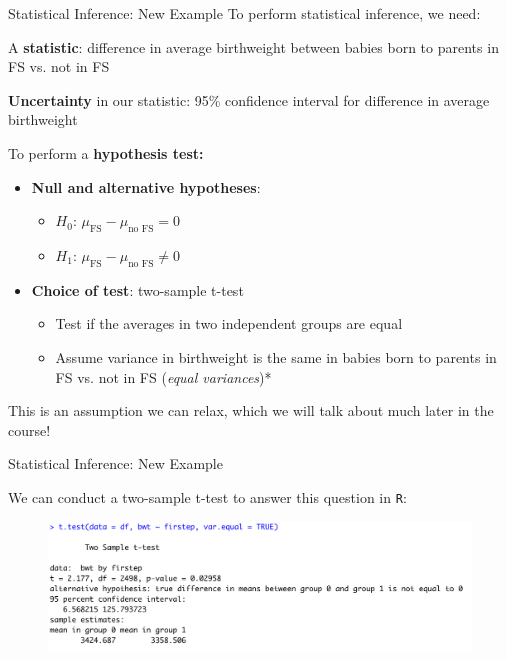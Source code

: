 \documentclass[10pt,t]{beamer}
\begin{document}
\begin{frame}{Statistical Inference: New Example}
To perform statistical inference, we need:

\vspace{0.3cm}

A \textbf{statistic}: difference in average birthweight between babies born to parents in FS vs. not in FS

\vspace{0.3cm}

\textbf{Uncertainty} in our statistic: 95\% confidence interval for difference in average birthweight

\vspace{0.3cm}

To perform a \textbf{hypothesis test:}

\begin{itemize}
	\item \textbf{Null and alternative hypotheses}:
	\begin{itemize}
		\item $H_0$: $\mu_{\text{FS}} - \mu_{\text{no FS}} = 0$
		\item $H_1$: $\mu_{\text{FS}} - \mu_{\text{no FS}} \neq 0$
	\end{itemize}
	\item \textbf{Choice of test}: two-sample t-test
	\begin{itemize}
		\item Test if the averages in two independent groups are equal
		\item Assume variance in birthweight is the same in babies born to parents in FS vs. not in FS (\textit{equal variances})*
	\end{itemize}
\end{itemize}

\small *This is an assumption we can relax, which we will talk about much later in the course!

\end{frame}

\begin{frame}{Statistical Inference: New Example}

We can conduct a two-sample t-test to answer this question in \texttt{R}:

\vspace{0.3cm}

\begin{figure}
\centering \includegraphics[scale=0.5]{ttest1.png}
\end{figure}

\end{frame}
\end{document}

